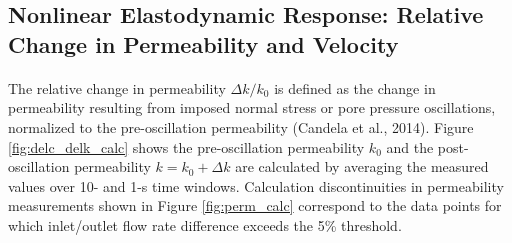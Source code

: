 

\subsection{Nonlinear Elastodynamic Response: Relative Change in Permeability and Velocity}
\paragraph{}

The relative change in permeability $ \Delta k/k_0 $ is defined as the change in permeability resulting from imposed normal stress or pore pressure oscillations, normalized to the pre-oscillation permeability (Candela et al., 2014). Figure \ref{fig:delc_delk_calc} shows the pre-oscillation permeability $ k_0 $ and the post-oscillation permeability $ k = k_0 + \Delta k $ are calculated by averaging the measured values over 10- and 1-s time windows. Calculation discontinuities in permeability measurements shown in Figure \ref{fig:perm_calc} correspond to the data points for which inlet/outlet flow rate difference exceeds the 5\% threshold. 

